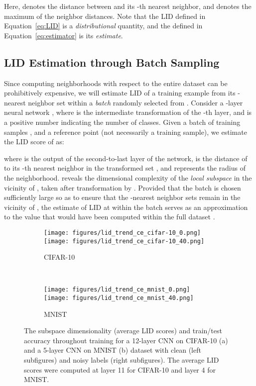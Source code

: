 \documentclass{article}
\begin{document}
\noindent Here,  denotes the distance between  and its -th nearest neighbor, and  denotes the maximum of the neighbor distances. Note that the LID defined in Equation~\eqref{eq:LID} is a \textit{distributional} quantity, and the  defined in Equation~\eqref{eq:estimator} is its \textit{estimate}.


\subsection{LID Estimation through Batch Sampling}\label{sec:lid_dnn}
Since computing neighborhoods with respect to the entire dataset  can be prohibitively expensive, we will estimate LID of a training example  from its -nearest neighbor set within a \textit{batch} randomly selected from .   
Consider a -layer neural network , where  is the intermediate transformation of the -th layer, and  is a positive number indicating the number of classes. Given a batch of training samples , and a reference point  (not necessarily a training sample), we estimate the LID score of  as:

where  is the output of the second-to-last layer of the network,  is the distance of  to its -th nearest neighbor in the transformed set , and  represents the radius of the neighborhood.  reveals the dimensional complexity of the {\em local subspace} in the vicinity of , taken after transformation by . Provided that the batch is chosen sufficiently large so as to ensure that the -nearest neighbor sets remain in the vicinity of , the estimate of LID at  within the batch serves as an approximation to the value that would have been computed within the full dataset . 







\begin{figure}[!t]
\centering
\begin{subfigure}{.5\textwidth}
  \centering
  \texttt{[image: figures/lid\_trend\_ce\_cifar-10\_0.png]}
\texttt{[image: figures/lid\_trend\_ce\_cifar-10\_40.png]}
  \caption{CIFAR-10}
  \label{fig:lid_cifar}
\end{subfigure} \\
\begin{subfigure}{.5\textwidth}
  \centering
  \texttt{[image: figures/lid\_trend\_ce\_mnist\_0.png]}
\texttt{[image: figures/lid\_trend\_ce\_mnist\_40.png]}
  \caption{MNIST}
  \label{fig:lid_mnist}
\end{subfigure}
\caption{The subspace dimensionality (average LID scores) and train/test accuracy throughout training for a 12-layer CNN on CIFAR-10 (a) and a 5-layer CNN on MNIST (b) dataset with clean (left subfigures) and noisy labels (right subfigures). The average LID scores were computed at layer 11 for CIFAR-10 and layer 4 for MNIST.}
\label{fig:lid_trends}
\vspace{-0.2in}
\end{figure}
\end{document}
